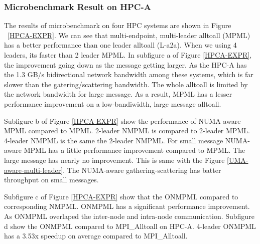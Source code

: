 \subsubsection{Microbenchmark Result on HPC-A}
The results of microbenchmark on four HPC systems are shown in Figure ~\ref{HPCA-EXPR}.
We can see that multi-endpoint, multi-leader alltoall (MPML) has a better performance than one leader alltoall (L-a2a).
When we using 4 leaders, its faster than 2 leader MPML.
In subfigure a of Figure \ref{HPCA-EXPR}, the improvement going down as the message getting larger.
As the HPC-A has the 1.3 GB/s bidirectional network bandwidth among these systems, which is far slower than the gatering/scattering bandwidth.
The whole alltoall is limited by the network bandwidth for large message.
As a result, MPML has a lesser performance improvement on a low-bandiwidth, large message alltoall.

Subfigure b of Figure \ref{HPCA-EXPR} show the performance of NUMA-aware MPML compared to MPML.
2-leader NMPML is compared to 2-leader MPML. 4-leader NMPML is the same the 2-leader NMPML.
For small message NUMA-aware MPML has a little performance improvement compared to MPML.
The large message has nearly no improvement.
This is same with the Figure \ref{UMA-aware-multi-leader}. The NUMA-aware gathering-scattering has batter throughput on small messages.

Subfigure c of Figure \ref{HPCA-EXPR} show that the ONMPML compared to corresponding NMPML.
ONMPML has a significant performance improvement. 
As ONMPML overlaped the inter-node and intra-node communication.
Subfigure d show the ONMPML compared to MPI\_Alltoall on HPC-A.
4-leader ONMPML has a 3.53x  speedup  on average compared to MPI\_Alltoall.
